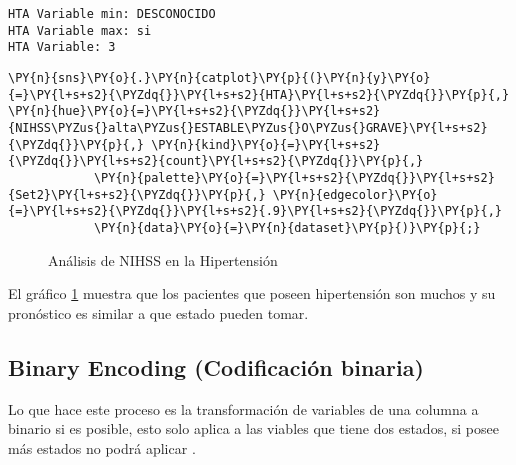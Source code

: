     \begin{Verbatim}[commandchars=\\\{\}]
HTA Variable min: DESCONOCIDO
HTA Variable max: si
HTA Variable: 3
    \end{Verbatim}

    \begin{tcolorbox}[breakable, size=fbox, boxrule=1pt, pad at break*=1mm,colback=cellbackground, colframe=cellborder]
\begin{Verbatim}[commandchars=\\\{\}]
\PY{n}{sns}\PY{o}{.}\PY{n}{catplot}\PY{p}{(}\PY{n}{y}\PY{o}{=}\PY{l+s+s2}{\PYZdq{}}\PY{l+s+s2}{HTA}\PY{l+s+s2}{\PYZdq{}}\PY{p}{,} \PY{n}{hue}\PY{o}{=}\PY{l+s+s2}{\PYZdq{}}\PY{l+s+s2}{NIHSS\PYZus{}alta\PYZus{}ESTABLE\PYZus{}O\PYZus{}GRAVE}\PY{l+s+s2}{\PYZdq{}}\PY{p}{,} \PY{n}{kind}\PY{o}{=}\PY{l+s+s2}{\PYZdq{}}\PY{l+s+s2}{count}\PY{l+s+s2}{\PYZdq{}}\PY{p}{,}
            \PY{n}{palette}\PY{o}{=}\PY{l+s+s2}{\PYZdq{}}\PY{l+s+s2}{Set2}\PY{l+s+s2}{\PYZdq{}}\PY{p}{,} \PY{n}{edgecolor}\PY{o}{=}\PY{l+s+s2}{\PYZdq{}}\PY{l+s+s2}{.9}\PY{l+s+s2}{\PYZdq{}}\PY{p}{,}
            \PY{n}{data}\PY{o}{=}\PY{n}{dataset}\PY{p}{)}\PY{p}{;}
\end{Verbatim}
\end{tcolorbox}

\begin{center}
    	\begin{figure}[H]
	\centering
	\caption{Análisis de NIHSS en la Hipertensión}
	\label{fig:aNISSh}
	\end{figure}
\end{center}
    
    El gráfico \ref{fig:aNISSh} muestra que los pacientes que poseen hipertensión son muchos
y su pronóstico es similar a que estado pueden tomar.

    \hypertarget{binary-encoding-codificaciuxf3n-binaria}{%
\subsection{Binary Encoding (Codificación
binaria)}\label{binary-encoding-codificaciuxf3n-binaria}}

Lo que hace este proceso es la transformación de variables de una
columna a binario si es posible, esto solo aplica a las viables que
tiene dos estados, si posee más estados no podrá aplicar \cite{Hancock2020}.

